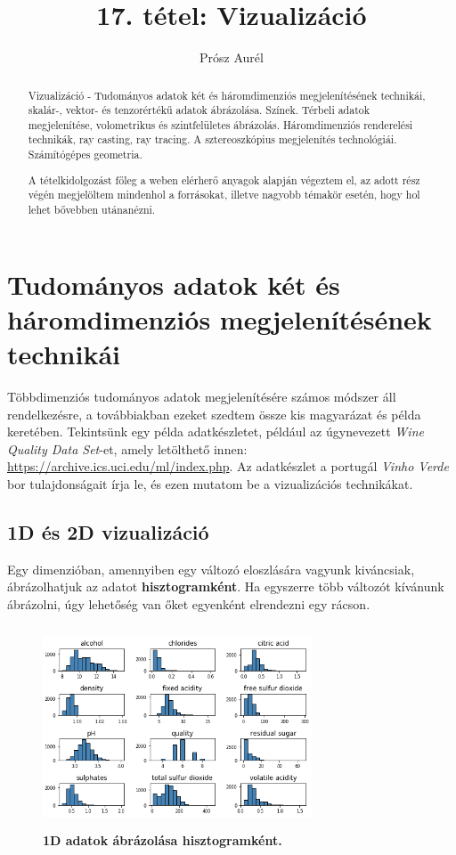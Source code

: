 \documentclass[12pt]{article}
\theoremstyle{plain}
\begin{document}
\title{17. tétel: Vizualizáció}
\author{Prósz Aurél}

\maketitle


\begin{abstract}
   \centering
   Vizualizáció - Tudományos adatok két és háromdimenziós megjelenítésének technikái, skalár-, vektor- és tenzorértékű adatok ábrázolása. Színek. Térbeli adatok megjelenítése, volometrikus és szintfelületes ábrázolás. Háromdimenziós renderelési technikák, ray casting, ray tracing. A sztereoszkópius megjelenítés technológiái. Számítógépes geometria.

   A tételkidolgozást főleg a weben elérherő anyagok alapján végeztem el, az adott rész végén megjelöltem mindenhol a forrásokat, illetve nagyobb témakör esetén, hogy hol lehet bővebben utánanézni.
\end{abstract}

\vfill

\tableofcontents

\section{Tudományos adatok két és háromdimenziós megjelenítésének technikái}
Többdimenziós tudományos adatok megjelenítésére számos módszer áll rendelkezésre, a továbbiakban ezeket szedtem össze kis magyarázat és példa keretében. 
Tekintsünk egy példa adatkészletet, például az úgynevezett \textit{Wine Quality Data Set}-et, amely letölthető innen:  \url{https://archive.ics.uci.edu/ml/index.php}. Az adatkészlet a portugál \textit{Vinho Verde} bor tulajdonságait írja le, és ezen mutatom be a vizualizációs technikákat. 


\subsection{1D és 2D vizualizáció}
Egy dimenzióban, amennyiben egy változó eloszlására vagyunk kiváncsiak, ábrázolhatjuk az adatot \textbf{hisztogramként}. Ha egyszerre több változót kívánunk ábrázolni, úgy lehetőség van őket egyenként elrendezni egy rácson. 

\begin{figure}[H]
   \centering
   \includegraphics[width=8cm, height=6cm]{media/hist.png}
   \caption{\textbf{1D adatok ábrázolása hisztogramként.}}
   \label{fig:GeneralDiagram}
\end{figure}
\end{document}
